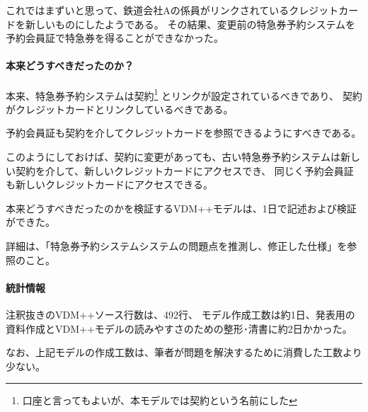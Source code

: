 これではまずいと思って、鉄道会社Aの係員がリンクされているクレジットカードを新しいものにしたようである。
その結果、変更前の特急券予約システムを予約会員証で特急券を得ることができなかった。


\paragraph{本来どうすべきだったのか？}
本来、特急券予約システムは契約\footnote{口座と言ってもよいが、本モデルでは契約という名前にした}
とリンクが設定されているべきであり、
契約がクレジットカードとリンクしているべきである。

予約会員証も契約を介してクレジットカードを参照できるようにすべきである。

このようにしておけば、契約に変更があっても、古い特急券予約システムは新しい契約を介して、新しいクレジットカードにアクセスでき、
同じく予約会員証も新しいクレジットカードにアクセスできる。

本来どうすべきだったのかを検証するVDM++モデルは、1日で記述および検証ができた。

詳細は、「特急券予約システムシステムの問題点を推測し、修正した仕様」を参照のこと。


\paragraph{統計情報}
注釈抜きのVDM++ソース行数は、492行、
モデル作成工数は約1日、発表用の資料作成とVDM++モデルの読みやすさのための整形･清書に約2日かかった。

なお、上記モデルの作成工数は、筆者が問題を解決するために消費した工数より少ない。